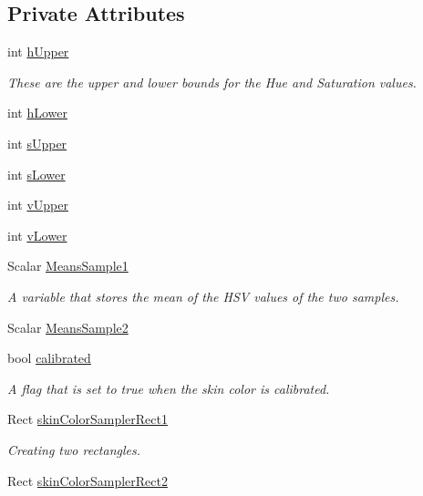 \subsection*{Private Attributes}
\begin{DoxyCompactItemize}
\item 
int \hyperlink{class_gesture_detection_1_1_skin_color_detector_a48bd581cb2e8265fa4a26cdee2757c86}{h\+Upper}
\begin{DoxyCompactList}\small\item\em These are the upper and lower bounds for the Hue and Saturation values. \end{DoxyCompactList}\item 
int \hyperlink{class_gesture_detection_1_1_skin_color_detector_ae08f063d47dea63ee539dd41cee45097}{h\+Lower}
\item 
int \hyperlink{class_gesture_detection_1_1_skin_color_detector_ae771d8e46f1494e88782674983deaf56}{s\+Upper}
\item 
int \hyperlink{class_gesture_detection_1_1_skin_color_detector_a2a6a3cb69984c68ce4bc83bb0f985677}{s\+Lower}
\item 
int \hyperlink{class_gesture_detection_1_1_skin_color_detector_a82c6256414d9c3cb968d6f0de12fc7d9}{v\+Upper}
\item 
int \hyperlink{class_gesture_detection_1_1_skin_color_detector_adc72a8fe90eb2b5a578bded973229c23}{v\+Lower}
\item 
Scalar \hyperlink{class_gesture_detection_1_1_skin_color_detector_a8a9acdec847621566cf543a9ac7512b5}{Means\+Sample1}
\begin{DoxyCompactList}\small\item\em A variable that stores the mean of the H\+SV values of the two samples. \end{DoxyCompactList}\item 
Scalar \hyperlink{class_gesture_detection_1_1_skin_color_detector_a82bfb240375cc9ab7d8fafc674a1efc4}{Means\+Sample2}
\item 
bool \hyperlink{class_gesture_detection_1_1_skin_color_detector_aef5ea498d5f27603fa5c2f17a5ebeb25}{calibrated}
\begin{DoxyCompactList}\small\item\em A flag that is set to true when the skin color is calibrated. \end{DoxyCompactList}\item 
Rect \hyperlink{class_gesture_detection_1_1_skin_color_detector_a207207cc6f88590de2769d65e125b76a}{skin\+Color\+Sampler\+Rect1}
\begin{DoxyCompactList}\small\item\em Creating two rectangles. \end{DoxyCompactList}\item 
Rect \hyperlink{class_gesture_detection_1_1_skin_color_detector_ac24f18c34a4271f421089643af58ef9c}{skin\+Color\+Sampler\+Rect2}
\end{DoxyCompactItemize}



